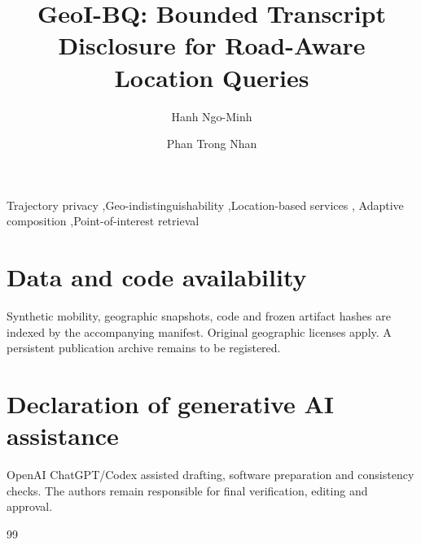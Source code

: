 \documentclass[9pt,letterpaper,twocolumn]{extarticle}
\title{GeoI-BQ: Bounded Transcript Disclosure for Road-Aware Location Queries}
\author{Hanh Ngo-Minh \and Phan Trong Nhan}
\date{}
\begin{document}
\maketitle
\begin{abstract}

\end{abstract}
\begin{keyword}
Trajectory privacy \sep Geo-indistinguishability \sep Location-based services \sep
Adaptive composition \sep Point-of-interest retrieval
\end{keyword}






\section*{Data and code availability}
Synthetic mobility, geographic snapshots, code and frozen artifact hashes are indexed
by the accompanying manifest. Original geographic licenses apply.
A persistent publication archive remains to be registered.
\section*{Declaration of generative AI assistance}
OpenAI ChatGPT/Codex assisted drafting, software preparation and consistency checks.
The authors remain responsible for final verification, editing and approval.
\begin{thebibliography}{99}

\end{thebibliography}
\end{document}
